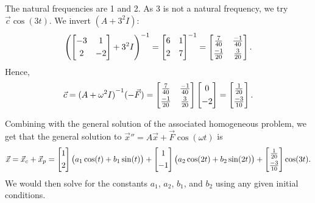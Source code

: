 \begin{example}
The natural frequencies are 1 and 2.  As 3 is not a
natural frequency, we try $\vec{c} \cos (3t)$.
We invert $(A+3^2 I)$:
\begin{equation*}
{\left( \begin{bmatrix}
-3 & 1 \\
\noalign{\smallskip}
2 & -2
\end{bmatrix}
+3^2 I\right)}^{-1}
=
{\begin{bmatrix}
6 & 1 \\
\noalign{\smallskip}
2 & 7
\end{bmatrix}}^{-1}
=
\begin{bmatrix}
\frac{7}{40} & \frac{-1}{40} \\
\noalign{\smallskip}
\frac{-1}{20} & \frac{3}{20}
\end{bmatrix} .
\end{equation*}
Hence,
\begin{equation*}
\vec{c} = 
{(A +\omega^2 I)}^{-1}
(-\vec{F} ) = 
\begin{bmatrix}
\frac{7}{40} & \frac{-1}{40} \\
\noalign{\smallskip}
\frac{-1}{20} & \frac{3}{20}
\end{bmatrix}
\begin{bmatrix}
0 \\
\noalign{\smallskip}
-2
\end{bmatrix}
=
\begin{bmatrix}
\frac{1}{20} \\
\noalign{\smallskip}
\frac{-3}{10}
\end{bmatrix} .
\end{equation*}

Combining with the general solution of the associated
homogeneous problem, we get that the general solution to
${\vec{x}}'' = A \vec{x} + \vec{F} \cos (\omega t)$ is
\begin{equation*}
\vec{x}
= \vec{x}_c + \vec{x}_p
=
\begin{bmatrix} 1 \\
\noalign{\smallskip}
2 \end{bmatrix}
\bigl( a_1 \cos (t) + b_1 \sin (t) \bigr)
+
\begin{bmatrix} 1 \\
\noalign{\smallskip}
-1 \end{bmatrix}
\bigl( a_2 \cos (2t) + b_2 \sin (2t) \bigr)
+
\begin{bmatrix}
\frac{1}{20} \\
\noalign{\smallskip}
\frac{-3}{10}
\end{bmatrix}
\cos (3t) .
\end{equation*}
We would then solve for the constants
$a_1$, $a_2$, $b_1$, and $b_2$ using
any given initial conditions.
\end{example}

